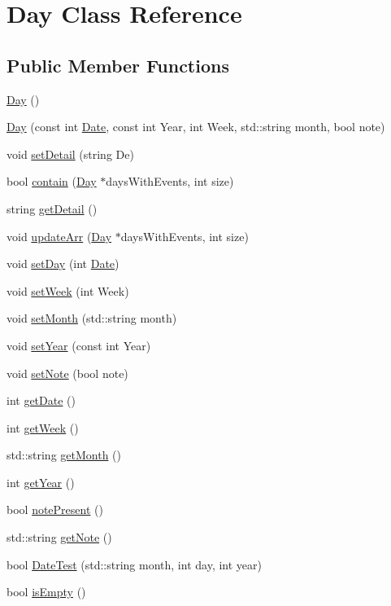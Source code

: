 \hypertarget{class_day}{}\section{Day Class Reference}
\label{class_day}
\subsection*{Public Member Functions}
\begin{DoxyCompactItemize}
\item 
\hyperlink{class_day_a0d38b5839dd80b179cb8f0669283b3aa}{Day} ()
\item 
\hyperlink{class_day_a1f2f885b1328511d8b96b050673ba35d}{Day} (const int \hyperlink{struct_date}{Date}, const int Year, int Week, std\+::string month, bool note)
\item 
void \hyperlink{class_day_acb0181b89543f4a0e71f85d5ddb78651}{set\+Detail} (string De)
\item 
bool \hyperlink{class_day_a84a4efadd13d49d372d47ad609c5f598}{contain} (\hyperlink{class_day}{Day} $\ast$days\+With\+Events, int size)
\item 
string \hyperlink{class_day_adf187d211b1ea4561832486f7094b18b}{get\+Detail} ()
\item 
void \hyperlink{class_day_afb73606e2cd648edcc8256a8d76a3dbb}{update\+Arr} (\hyperlink{class_day}{Day} $\ast$days\+With\+Events, int size)
\item 
void \hyperlink{class_day_a0dcbab77f0504f01fdd9a8584b590121}{set\+Day} (int \hyperlink{struct_date}{Date})
\item 
void \hyperlink{class_day_abd9ffcfab90af3e2defaa2491a3761bb}{set\+Week} (int Week)
\item 
void \hyperlink{class_day_aa6fc8b1b08074305e6b0dd3f4bc21151}{set\+Month} (std\+::string month)
\item 
void \hyperlink{class_day_a9fc013d905327fd70003970125247d91}{set\+Year} (const int Year)
\item 
void \hyperlink{class_day_a40f873f51621bdb3cf657e127d43cdaf}{set\+Note} (bool note)
\item 
int \hyperlink{class_day_a6161ef9f7717d596af00031cc362fa04}{get\+Date} ()
\item 
int \hyperlink{class_day_a43799b84e1a16df9bf16b3de69605b9a}{get\+Week} ()
\item 
std\+::string \hyperlink{class_day_ae10fc576ccdf6d58ef42c8cd1b371401}{get\+Month} ()
\item 
int \hyperlink{class_day_acec9a2c25c4e19fa6f46cd2671dfa51d}{get\+Year} ()
\item 
bool \hyperlink{class_day_a097b2409c34e772e1b133c2c344ab2bf}{note\+Present} ()
\item 
std\+::string \hyperlink{class_day_ac0d1e5a970de4e30bc563c33cf69cbc3}{get\+Note} ()
\item 
bool \hyperlink{class_day_afb77f4b9df921cfb4176ba6ef309b9b8}{Date\+Test} (std\+::string month, int day, int year)
\item 
bool \hyperlink{class_day_aa4dd0d85c6fa11300b10c2a40c530c4f}{is\+Empty} ()
\end{DoxyCompactItemize}


